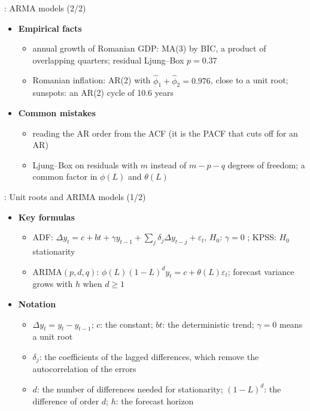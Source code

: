 \begin{frame}{: ARMA models (2/2)}
\itemsize{\footnotesize}
\begin{itemize}
    \item \textbf{Empirical facts}
    \begin{itemize}
        \item annual growth of Romanian GDP: MA(3) by BIC, a product of overlapping quarters; residual Ljung--Box $p = 0.37$
        \item Romanian inflation: AR(2) with $\hat\phi_1 + \hat\phi_2 = 0.976$, close to a unit root; sunspots: an AR(2) cycle of 10.6 years
    \end{itemize}
    \item \textbf{Common mistakes}
    \begin{itemize}
        \item reading the AR order from the ACF (it is the PACF that cuts off for an AR)
        \item Ljung--Box on residuals with $m$ instead of $m - p - q$ degrees of freedom; a common factor in $\phi(L)$ and $\theta(L)$
    \end{itemize}
\end{itemize}
\end{frame}

\begin{frame}{: Unit roots and ARIMA models (1/2)}
\itemsize{\footnotesize}
\begin{itemize}
    \item \textbf{Key formulas}
    \begin{itemize}
        \item ADF: $\Delta y_t = c + bt + \gamma y_{t-1} + \sum_j\delta_j\Delta y_{t-j} + \varepsilon_t$, $H_0$: $\gamma = 0$ ; KPSS: $H_0$ stationarity 
        \item ARIMA$(p,d,q)$: $\phi(L)(1 - L)^d y_t = c + \theta(L)\varepsilon_t$; forecast variance grows with $h$ when $d \ge 1$
    \end{itemize}
    \item \textbf{Notation}
    \begin{itemize}
        \item $\Delta y_t = y_t - y_{t-1}$; $c$: the constant; $bt$: the deterministic trend; $\gamma = 0$ means a unit root
        \item $\delta_j$: the coefficients of the lagged differences, which remove the autocorrelation of the errors
        \item $d$: the number of differences needed for stationarity; $(1 - L)^d$: the difference of order $d$; $h$: the forecast horizon
    \end{itemize}
\end{itemize}
\end{frame}

